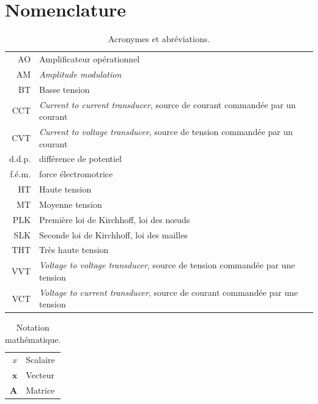

\chapter{Nomenclature}

\begin{table}
	\caption{Acronymes et abréviations.}
	\begin{boxedminipage}{\linewidth}
\begin{tabularx}{\linewidth}{rX}
AO & Amplificateur opérationnel \\
AM & \textit{Amplitude modulation} \\
BT & Basse tension \\
CCT & \textit{Current to current transducer}, source de courant commandée par un courant\\
CVT & \textit{Current to voltage transducer}, source de tension commandée par un courant\\
d.d.p. & différence de potentiel \\
f.é.m. & force électromotrice \\
HT & Haute tension \\
MT & Moyenne tension \\
PLK & Première loi de Kirchhoff, loi des n\oe{}uds\\
SLK & Seconde loi de Kirchhoff, loi des mailles\\
THT & Très haute tension \\
VVT & \textit{Voltage to voltage transducer}, source de tension commandée par une tension\\
VCT & \textit{Voltage to current transducer}, source de courant commandée par une tension\\
\end{tabularx}
\end{boxedminipage}
\end{table}


\begin{table}
\caption{Notation mathématique.}
	\begin{boxedminipage}{\linewidth}
\begin{tabularx}{\linewidth}{rX}
	$x$ & Scalaire\\
	$\mathbf{x}$ & Vecteur \\
	$\mathbf{A}$ & Matrice
\end{tabularx}
\end{boxedminipage}
\end{table}

